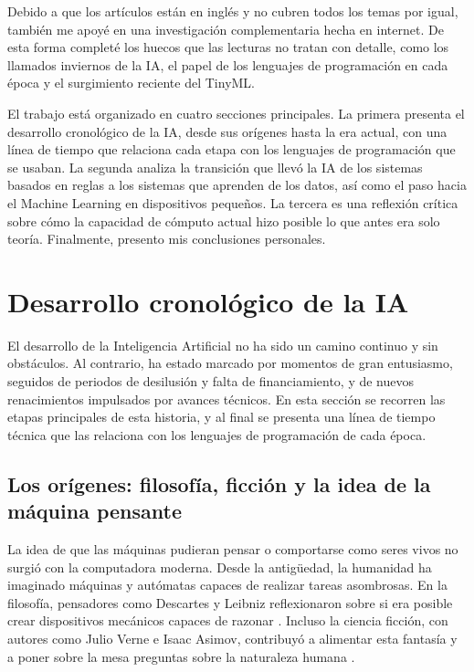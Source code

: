 \documentclass[11pt]{article}
\begin{document}
Debido a que los artículos están en inglés y no cubren todos los temas por igual, también me apoyé en una investigación complementaria hecha en internet. De esta forma completé los huecos que las lecturas no tratan con detalle, como los llamados inviernos de la IA, el papel de los lenguajes de programación en cada época y el surgimiento reciente del TinyML.

El trabajo está organizado en cuatro secciones principales. La primera presenta el desarrollo cronológico de la IA, desde sus orígenes hasta la era actual, con una línea de tiempo que relaciona cada etapa con los lenguajes de programación que se usaban. La segunda analiza la transición que llevó la IA de los sistemas basados en reglas a los sistemas que aprenden de los datos, así como el paso hacia el Machine Learning en dispositivos pequeños. La tercera es una reflexión crítica sobre cómo la capacidad de cómputo actual hizo posible lo que antes era solo teoría. Finalmente, presento mis conclusiones personales.

\section{Desarrollo cronológico de la IA}

El desarrollo de la Inteligencia Artificial no ha sido un camino continuo y sin obstáculos. Al contrario, ha estado marcado por momentos de gran entusiasmo, seguidos de periodos de desilusión y falta de financiamiento, y de nuevos renacimientos impulsados por avances técnicos. En esta sección se recorren las etapas principales de esta historia, y al final se presenta una línea de tiempo técnica que las relaciona con los lenguajes de programación de cada época.

\subsection{Los orígenes: filosofía, ficción y la idea de la máquina pensante}

La idea de que las máquinas pudieran pensar o comportarse como seres vivos no surgió con la computadora moderna. Desde la antigüedad, la humanidad ha imaginado máquinas y autómatas capaces de realizar tareas asombrosas. En la filosofía, pensadores como Descartes y Leibniz reflexionaron sobre si era posible crear dispositivos mecánicos capaces de razonar \parencite{buchanan_very_2005}. Incluso la ciencia ficción, con autores como Julio Verne e Isaac Asimov, contribuyó a alimentar esta fantasía y a poner sobre la mesa preguntas sobre la naturaleza humana \parencite{buchanan_very_2005}.
\end{document}
